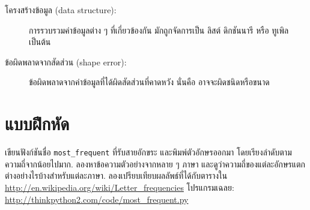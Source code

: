 \begin{description}
\item[โครงสร้างข้อมูล (data structure):] 
การรวบรวมค่าข้อมูลต่าง ๆ ที่เกี่ยวข้องกัน
มักถูกจัดการเป็น ลิสต์ ดิกชันนารี หรือ ทูเพิล เป็นต้น

\item[ข้อผิดพลาดจากสัดส่วน (shape error):] 
ข้อผิดพลาดจากค่าข้อมูลที่ได้ผิดสัดส่วนที่คาดหวัง
นั่นคือ อาจจะผิดชนิดหรือขนาด

\end{description}

\section{แบบฝึกหัด}

\begin{exercise}


เขียนฟังก์ชันชื่อ \verb|most_frequent| ที่รับสายอักขระ
และพิมพ์ตัวอักษรออกมา โดยเรียงลำดับตามความถี่จากน้อยไปมาก.
ลองหาข้อความตัวอย่างจากหลาย ๆ ภาษา 
และดูว่าความถี่ของแต่ละอักษรแตกต่างอย่างไรบ้างสำหรับแต่ละภาษา.
ลองเปรียบเทียบผลลัพธ์ที่ได้กับตารางใน
\url{http://en.wikipedia.org/wiki/Letter_frequencies}  
โปรแกรมเฉลย:
\url{http://thinkpython2.com/code/most_frequent.py}   


\end{exercise}
\vspace{0.5cm}


